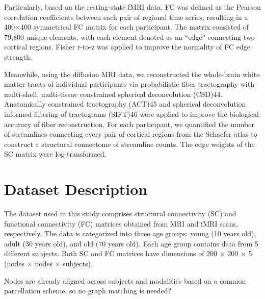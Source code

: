 Particularly, based on the resting-state fMRI data, FC was defined as 
the Pearson correlation coefficients between each pair of regional 
time series, resulting in a 400×400 symmetrical FC matrix for each 
participant. The matrix consisted of 79,800 unique elements, with 
each element denoted as an “edge” connecting two cortical regions. 
Fisher r-to-z was applied to improve the normality of FC edge strength. 

Meanwhile, using the diffusion MRI data, we reconstructed the whole-brain 
white matter tracts of individual participants via probabilistic fiber 
tractography with multi-shell, multi-tissue constrained spherical 
deconvolution (CSD)44. Anatomically constrained tractography (ACT)45 and 
spherical deconvolution informed filtering of tractograms (SIFT)46 were 
applied to improve the biological accuracy of fiber reconstruction. 
For each participant, we quantified the number of streamlines connecting 
every pair of cortical regions from the Schaefer atlas to construct a 
structural connectome of streamline counts. 
The edge weights of the SC matrix were log-transformed.
\cite{Chen2024}

\section{Dataset Description}
The dataset used in this study comprises structural connectivity (SC) and functional connectivity (FC) matrices 
obtained from MRI and fMRI scans, respectively. The data is categorized into three age groups: 
young (10 years old), adult (30 years old), and old (70 years old). Each age group contains data from 5 different subjects.
Both SC and FC matrices have dimensions of 200 $\times$ 200 $\times$ 5 (nodes $\times$ nodes $\times$ subjects).

Nodes are already aligned across subjects and modalities based on a 
common parcellation scheme, so no graph matching is needed? \cite{Puxeddu2022}
